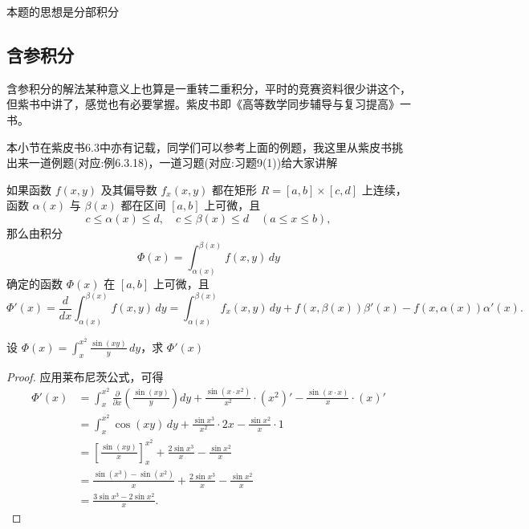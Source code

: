 \begin{note}
本题的思想是分部积分
\end{note}


\newpage



\subsection{含参积分}

含参积分的解法某种意义上也算是一重转二重积分，平时的竞赛资料很少讲这个，但紫书中讲了，感觉也有必要掌握。紫皮书即《高等数学同步辅导与复习提高》一书。

本小节在紫皮书6.3中亦有记载，同学们可以参考上面的例题，我这里从紫皮书挑出来一道例题(对应:例6.3.18)，一道习题(对应:习题9(1))给大家讲解

\begin{theorem}
    如果函数 \(f(x,y)\) 及其偏导数 \(f_x(x,y)\) 都在矩形 \(R=[a,b] \times [c,d]\) 上连续，
    函数 \(\alpha(x)\) 与 \(\beta(x)\) 都在区间 \([a,b]\) 上可微，且
    \[
    c \leq \alpha(x) \leq d, \quad c \leq \beta(x) \leq d \quad (a \leq x \leq b),
    \]
    那么由积分
    \[
    \Phi(x) = \int_{\alpha(x)}^{\beta(x)} f(x,y)  \, dy
    \]
    确定的函数 \(\Phi(x)\) 在 \([a,b]\) 上可微，且
    \[
    \Phi'(x) = \frac{d}{dx} \int_{\alpha(x)}^{\beta(x)} f(x,y)  \, dy
    = \int_{\alpha(x)}^{\beta(x)} f_x(x,y)  \, dy
    + f(x,\beta(x)) \beta'(x) - f(x,\alpha(x)) \alpha'(x).
    \]
\end{theorem}

\begin{example}
    设 \(\Phi(x) = \displaystyle \int_{x}^{x^2} \frac{\sin(xy)}{y}  \, dy\)，求 \(\Phi'(x)\)
\end{example}

\begin{proof}
    应用莱布尼茨公式，可得
    \begin{align*}
        \Phi'(x) &= \int_{x}^{x^2} \frac{\partial}{\partial x} \left( \frac{\sin(xy)}{y} \right) dy 
        + \frac{\sin(x \cdot x^2)}{x^2} \cdot (x^2)' - \frac{\sin(x \cdot x)}{x} \cdot (x)' \\
        &= \int_{x}^{x^2} \cos(xy)  \, dy + \frac{\sin x^3}{x^2} \cdot 2x - \frac{\sin x^2}{x} \cdot 1 \\
        &= \left[ \frac{\sin(xy)}{x} \right]_{x}^{x^2} + \frac{2 \sin x^3}{x} - \frac{\sin x^2}{x} \\
        &= \frac{\sin(x^3) - \sin(x^2)}{x} + \frac{2 \sin x^3}{x} - \frac{\sin x^2}{x} \\
        &= \frac{3 \sin x^3 - 2 \sin x^2}{x}.
    \end{align*}
\end{proof}

